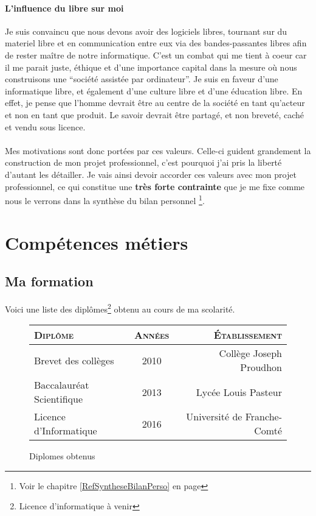 \documentclass[a4paper,12pt, draft]{report}
\newcommand{\tabTitle}[1]{\hfill{} \textsc{#1} \hfill{} }
\begin{document}
\paragraph{L'influence du libre sur moi}
Je suis convaincu que nous devons avoir des logiciels libres, tournant sur du materiel libre et en communication entre eux via des bandes-passantes libres afin de rester maître de notre informatique.
C'est un combat qui me tient à coeur car il me parait juste, éthique et d'une importance capital dans la mesure où nous construisons une ``société assistée par ordinateur''. Je suis en faveur d'une informatique libre, et également d'une culture libre et d'une éducation libre. En effet, je pense que l'homme devrait être au centre de la société en tant qu'acteur et non en tant que produit. Le savoir devrait être partagé, et non breveté, caché et vendu sous licence.

\paragraph{}
Mes motivations sont donc portées par ces valeurs. Celle-ci guident grandement la construction de mon projet professionnel, c'est pourquoi j'ai pris la liberté d'autant les détailler.
Je vais ainsi devoir accorder ces valeurs avec mon projet professionnel, ce qui constitue une \textbf{très forte contrainte} que je me fixe comme nous le verrons dans la synthèse du bilan personnel \footnote{Voir le chapitre \ref{RefSyntheseBilanPerso} en page \pageref{RefSyntheseBilanPerso}}.

\newpage

\section{Compétences métiers}
\subsection{Ma formation}
Voici une liste des diplômes\footnote{Licence d'informatique à venir} obtenu au cours de ma scolarité.
\begin{figure}[h]
\begin{center}
\begin{tabular}{|l|c|r|}
\hline
\tabTitle{Diplôme} & \tabTitle{Années} & \tabTitle{Établissement}\\
\hline
Brevet des collèges & 2010 & Collège Joseph Proudhon \\
\hline
Baccalauréat Scientifique & 2013 & Lycée Louis Pasteur \\
\hline
Licence d'Informatique & 2016 & Université de Franche-Comté\\
\hline
\end{tabular}
\end{center}
\caption{Diplomes obtenus} 
\end{figure}
\end{document}
